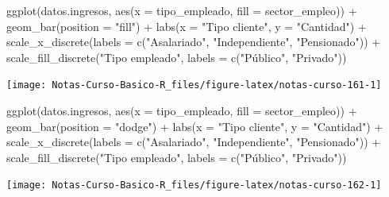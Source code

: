 \documentclass[
  12pt,
]{book}
\newenvironment{Shaded}{\begin{snugshade}}{\end{snugshade}}
\newcommand{\AttributeTok}[1]{\textcolor[rgb]{0.77,0.63,0.00}{#1}}
\newcommand{\FunctionTok}[1]{\textcolor[rgb]{0.00,0.00,0.00}{#1}}
\newcommand{\NormalTok}[1]{#1}
\newcommand{\SpecialCharTok}[1]{\textcolor[rgb]{0.00,0.00,0.00}{#1}}
\newcommand{\StringTok}[1]{\textcolor[rgb]{0.31,0.60,0.02}{#1}}
\begin{document}
\begin{Shaded}
\begin{Highlighting}[]
\FunctionTok{ggplot}\NormalTok{(datos.ingresos, }\FunctionTok{aes}\NormalTok{(}\AttributeTok{x =}\NormalTok{ tipo\_empleado, }\AttributeTok{fill =}\NormalTok{ sector\_empleo))  }\SpecialCharTok{+}
  \FunctionTok{geom\_bar}\NormalTok{(}\AttributeTok{position =} \StringTok{"fill"}\NormalTok{) }\SpecialCharTok{+}
  \FunctionTok{labs}\NormalTok{(}\AttributeTok{x =} \StringTok{"Tipo cliente"}\NormalTok{, }\AttributeTok{y =} \StringTok{"Cantidad"}\NormalTok{) }\SpecialCharTok{+}
  \FunctionTok{scale\_x\_discrete}\NormalTok{(}\AttributeTok{labels =} \FunctionTok{c}\NormalTok{(}\StringTok{"Asalariado"}\NormalTok{, }\StringTok{"Independiente"}\NormalTok{, }\StringTok{"Pensionado"}\NormalTok{)) }\SpecialCharTok{+}
  \FunctionTok{scale\_fill\_discrete}\NormalTok{(}\StringTok{"Tipo empleado"}\NormalTok{,}
    \AttributeTok{labels =} \FunctionTok{c}\NormalTok{(}\StringTok{"Público"}\NormalTok{, }\StringTok{"Privado"}\NormalTok{))}
\end{Highlighting}
\end{Shaded}

\begin{center}\texttt{[image: Notas-Curso-Basico-R\_files/figure-latex/notas-curso-161-1]} \end{center}

\begin{Shaded}
\begin{Highlighting}[]
\FunctionTok{ggplot}\NormalTok{(datos.ingresos, }\FunctionTok{aes}\NormalTok{(}\AttributeTok{x =}\NormalTok{ tipo\_empleado, }\AttributeTok{fill =}\NormalTok{ sector\_empleo))  }\SpecialCharTok{+}
  \FunctionTok{geom\_bar}\NormalTok{(}\AttributeTok{position =} \StringTok{"dodge"}\NormalTok{) }\SpecialCharTok{+}
  \FunctionTok{labs}\NormalTok{(}\AttributeTok{x =} \StringTok{"Tipo cliente"}\NormalTok{, }\AttributeTok{y =} \StringTok{"Cantidad"}\NormalTok{) }\SpecialCharTok{+}
  \FunctionTok{scale\_x\_discrete}\NormalTok{(}\AttributeTok{labels =} \FunctionTok{c}\NormalTok{(}\StringTok{"Asalariado"}\NormalTok{, }\StringTok{"Independiente"}\NormalTok{, }\StringTok{"Pensionado"}\NormalTok{)) }\SpecialCharTok{+}
  \FunctionTok{scale\_fill\_discrete}\NormalTok{(}\StringTok{"Tipo empleado"}\NormalTok{,}
    \AttributeTok{labels =} \FunctionTok{c}\NormalTok{(}\StringTok{"Público"}\NormalTok{, }\StringTok{"Privado"}\NormalTok{))}
\end{Highlighting}
\end{Shaded}

\begin{center}\texttt{[image: Notas-Curso-Basico-R\_files/figure-latex/notas-curso-162-1]} \end{center}
\end{document}
